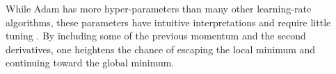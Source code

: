 While Adam has more hyper-parameters than many other learning-rate algorithms, these parameters have intuitive interpretations and require little tuning \cite{kingba}.
By including some of the previous momentum and the second derivatives, one heightens the chance of escaping the local minimum and continuing toward the global minimum. 



